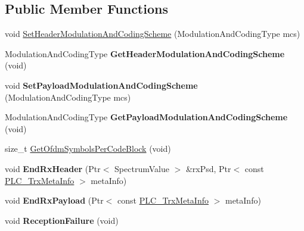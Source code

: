 \subsection*{\-Public \-Member \-Functions}
\begin{DoxyCompactItemize}
\item 
void \hyperlink{classns3_1_1PLC__InformationRatePhy_ac8d28e7f4c56c9c226a1992342ca4c06}{\-Set\-Header\-Modulation\-And\-Coding\-Scheme} (\-Modulation\-And\-Coding\-Type mcs)
\item 
\hypertarget{classns3_1_1PLC__InformationRatePhy_a5ce5620b8bffc866af027aa8cc62dd31}{\-Modulation\-And\-Coding\-Type {\bfseries \-Get\-Header\-Modulation\-And\-Coding\-Scheme} (void)}\label{classns3_1_1PLC__InformationRatePhy_a5ce5620b8bffc866af027aa8cc62dd31}

\item 
\hypertarget{classns3_1_1PLC__InformationRatePhy_a1d5d3ee73e863d3430d8c55eabd73276}{void {\bfseries \-Set\-Payload\-Modulation\-And\-Coding\-Scheme} (\-Modulation\-And\-Coding\-Type mcs)}\label{classns3_1_1PLC__InformationRatePhy_a1d5d3ee73e863d3430d8c55eabd73276}

\item 
\hypertarget{classns3_1_1PLC__InformationRatePhy_aa8b2963fd66fcb0cff550ac447337013}{\-Modulation\-And\-Coding\-Type {\bfseries \-Get\-Payload\-Modulation\-And\-Coding\-Scheme} (void)}\label{classns3_1_1PLC__InformationRatePhy_aa8b2963fd66fcb0cff550ac447337013}

\item 
size\-\_\-t \hyperlink{classns3_1_1PLC__InformationRatePhy_a84d9f169728aaf4ea913f2588002160c}{\-Get\-Ofdm\-Symbols\-Per\-Code\-Block} (void)
\item 
\hypertarget{classns3_1_1PLC__InformationRatePhy_a0566ea199f12a3b3ba760f0b3930e50b}{void {\bfseries \-End\-Rx\-Header} (\-Ptr$<$ \-Spectrum\-Value $>$ \&rx\-Psd, \-Ptr$<$ const \hyperlink{classns3_1_1PLC__TrxMetaInfo}{\-P\-L\-C\-\_\-\-Trx\-Meta\-Info} $>$ meta\-Info)}\label{classns3_1_1PLC__InformationRatePhy_a0566ea199f12a3b3ba760f0b3930e50b}

\item 
\hypertarget{classns3_1_1PLC__InformationRatePhy_a1708b250cf1fc92f5bb520185854bd20}{void {\bfseries \-End\-Rx\-Payload} (\-Ptr$<$ const \hyperlink{classns3_1_1PLC__TrxMetaInfo}{\-P\-L\-C\-\_\-\-Trx\-Meta\-Info} $>$ meta\-Info)}\label{classns3_1_1PLC__InformationRatePhy_a1708b250cf1fc92f5bb520185854bd20}

\item 
\hypertarget{classns3_1_1PLC__InformationRatePhy_a357bfdcd62ecda47ea1bdf191fe63491}{void {\bfseries \-Reception\-Failure} (void)}\label{classns3_1_1PLC__InformationRatePhy_a357bfdcd62ecda47ea1bdf191fe63491}


\end{DoxyCompactItemize}
